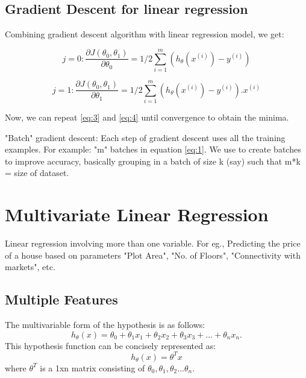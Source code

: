   \subsection{Gradient Descent for linear regression}
    Combining gradient descent algorithm with linear regression model, we get:

    \begin{equation} \label {eq:3}
      j = 0 : \frac{\partial {J(\theta_0, \theta_1)}}{\partial \theta_0} = 1/2 \sum_{i=1}^{m} (h_\theta(x^{(i)})-y^{(i)}) 
    \end{equation}

    \begin{equation} \label {eq:4}
      j = 1 : \frac{\partial {J(\theta_0, \theta_1)}}{\partial \theta_1} = 1/2 \sum_{i=1}^{m} (h_\theta(x^{(i)})-y^{(i)}).x^{(i)}
    \end{equation}

    Now, we can repeat \ref{eq:3} and \ref{eq:4} until convergence to obtain the minima.

    "Batch" gradient descent: Each step of gradient descent uses all the training examples.
    For example: "m" batches in equation \ref{eq:1}. We use to create batches to improve accuracy, basically grouping in a batch of size k (say) such that m*k = size of dataset.

\section{Multivariate Linear Regression}
  Linear regression involving more than one variable. For eg., Predicting the price of a house based on parameters "Plot Area", "No. of Floors", "Connectivity with markets", etc.

  \subsection{Multiple Features}
    The multivariable form of the hypothesis is as follows:
    \begin{equation} \label {eq:5}
      h_\theta(x) = \theta_0 + \theta_1x_1 + \theta_2x_2 + \theta_ 3x_3 + ... + \theta_{n}x_n.  
    \end{equation}
    This hypothesis function can be concisely represented as:
    \begin{equation}
      h_\theta(x) = \theta^{T}x
    \end{equation}
    where $ \theta^T $ is a 1xn matrix consisting of $ \theta_0, \theta_1, \theta_2 ... \theta_n $.


